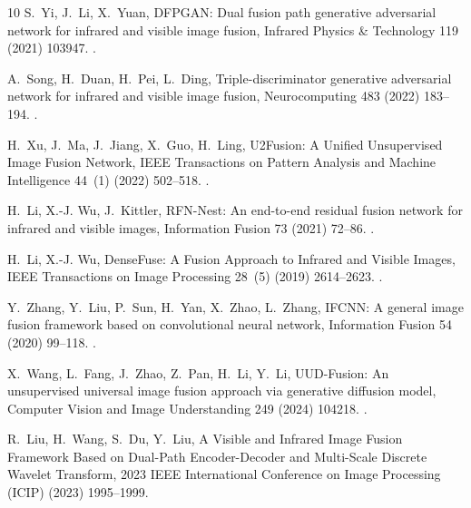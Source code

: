 \begin{thebibliography}{10}
S.~Yi, J.~Li, X.~Yuan, {DFPGAN: Dual fusion path generative adversarial network
  for infrared and visible image fusion}, Infrared Physics \& Technology 119
  (2021) 103947.
\newblock \href {https://doi.org/10.1016/j.infrared.2021.103947}
  {}.

A.~Song, H.~Duan, H.~Pei, L.~Ding, {Triple-discriminator generative adversarial
  network for infrared and visible image fusion}, Neurocomputing 483 (2022)
  183--194.
\newblock \href {https://doi.org/10.1016/j.neucom.2022.02.025}
  {}.

H.~Xu, J.~Ma, J.~Jiang, X.~Guo, H.~Ling, {U2Fusion: A Unified Unsupervised
  Image Fusion Network}, IEEE Transactions on Pattern Analysis and Machine
  Intelligence 44~(1) (2022) 502--518.
\newblock \href {https://doi.org/10.1109/tpami.2020.3012548}
  {}.

H.~Li, X.-J. Wu, J.~Kittler, {RFN-Nest: An end-to-end residual fusion network
  for infrared and visible images}, Information Fusion 73 (2021) 72--86.
\newblock \href {https://doi.org/10.1016/j.inffus.2021.02.023}
  {}.

H.~Li, X.-J. Wu, {DenseFuse: A Fusion Approach to Infrared and Visible Images},
  IEEE Transactions on Image Processing 28~(5) (2019) 2614--2623.
\newblock \href {https://doi.org/10.1109/tip.2018.2887342}
  {}.

Y.~Zhang, Y.~Liu, P.~Sun, H.~Yan, X.~Zhao, L.~Zhang, {IFCNN: A general image
  fusion framework based on convolutional neural network}, Information Fusion
  54 (2020) 99--118.
\newblock \href {https://doi.org/10.1016/j.inffus.2019.07.011}
  {}.

X.~Wang, L.~Fang, J.~Zhao, Z.~Pan, H.~Li, Y.~Li, {UUD-Fusion: An unsupervised
  universal image fusion approach via generative diffusion model}, Computer
  Vision and Image Understanding 249 (2024) 104218.
\newblock \href {https://doi.org/10.1016/j.cviu.2024.104218}
  {}.

R.~Liu, H.~Wang, S.~Du, Y.~Liu, {A Visible and Infrared Image Fusion Framework
  Based on Dual-Path Encoder-Decoder and Multi-Scale Discrete Wavelet
  Transform}, 2023 IEEE International Conference on Image Processing (ICIP)
  (2023) 1995--1999\newblock \href {https://doi.org/10.1109/icip49359.2023.10222863}
  {}.


\end{thebibliography}
